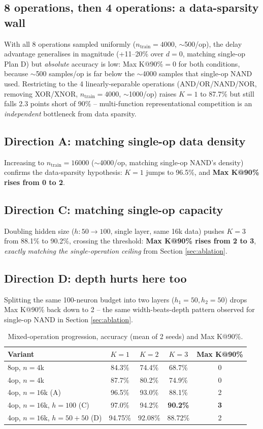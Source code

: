 \documentclass[conference]{IEEEtran}
\begin{document}
\subsection{8 operations, then 4 operations: a data-sparsity wall}
With all 8 operations sampled uniformly ($n_{\text{train}}{=}4000$, $\sim$500/op), the
delay advantage generalises in magnitude (+11--20\% over $d{=}0$, matching single-op Plan
D) but \emph{absolute} accuracy is low: Max K@90\%$=0$ for both conditions, because
$\sim$500 samples/op is far below the $\sim$4000 samples that single-op NAND used.
Restricting to the 4 linearly-separable operations (AND/OR/NAND/NOR, removing
XOR/XNOR, $n_{\text{train}}{=}4000$, $\sim$1000/op) raises $K{=}1$ to 87.7\% but still
falls 2.3 points short of 90\% -- multi-function representational competition is an
\emph{independent} bottleneck from data sparsity.

\subsection{Direction A: matching single-op data density}
Increasing to $n_{\text{train}}{=}16000$ ($\sim$4000/op, matching single-op NAND's
density) confirms the data-sparsity hypothesis: $K{=}1$ jumps to 96.5\%, and
\textbf{Max K@90\% rises from 0 to 2}.

\subsection{Direction C: matching single-op capacity}
Doubling hidden size ($h{:}50\to100$, single layer, same 16k data) pushes $K{=}3$
from 88.1\% to 90.2\%, crossing the threshold: \textbf{Max K@90\% rises from 2 to 3},
\emph{exactly matching the single-operation ceiling} from Section \ref{sec:ablation}.

\subsection{Direction D: depth hurts here too}
Splitting the same 100-neuron budget into two layers ($h_1{=}50,h_2{=}50$) drops
Max K@90\% back down to 2 -- the same width-beats-depth pattern observed for single-op
NAND in Section \ref{sec:ablation}.

\begin{table}[t]
\centering
\caption{Mixed-operation progression, accuracy (mean of 2 seeds) and Max K@90\%.}
\label{tab:step3}
\begin{tabular}{lcccc}
\toprule
Variant & $K{=}1$ & $K{=}2$ & $K{=}3$ & Max K@90\% \\
\midrule
8op, $n{=}4$k & 84.3\% & 74.4\% & 68.7\% & 0 \\
4op, $n{=}4$k & 87.7\% & 80.2\% & 74.9\% & 0 \\
4op, $n{=}16$k (A) & 96.5\% & 93.0\% & 88.1\% & 2 \\
4op, $n{=}16$k, $h{=}100$ (C) & 97.0\% & 94.2\% & \textbf{90.2\%} & \textbf{3} \\
4op, $n{=}16$k, $h{=}50{+}50$ (D) & 94.75\% & 92.08\% & 88.72\% & 2 \\
\bottomrule
\end{tabular}
\end{table}
\end{document}
